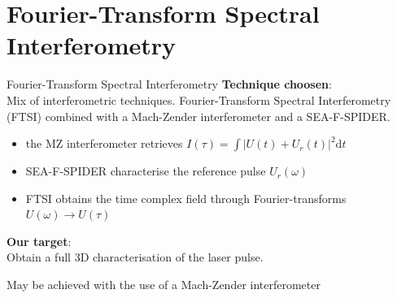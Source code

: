 \documentclass[11pt]{beamer}
\begin{document}
\section{Fourier-Transform Spectral Interferometry}
\begin{frame}{Fourier-Transform Spectral Interferometry}
\textbf{Technique choosen}:\\
Mix of interferometric techniques.
Fourier-Transform Spectral Interferometry (FTSI) combined with a Mach-Zender interferometer and a SEA-F-SPIDER.\\
\begin{itemize}
	\item the MZ interferometer retrieves $I(\tau) 	= \int|U(t) + U_r(t)|^2\mathrm{d}t$
	\item SEA-F-SPIDER characterise the reference pulse $U_r(\omega)$
	\item FTSI obtains the time complex field through Fourier-transforms $U(\omega) \rightarrow U(\tau)$
\end{itemize}

\vspace{15pt}
\textbf{Our target}:\\
Obtain a full 3D characterisation of the laser pulse.

\vspace{10pt}
May be achieved with the use of a Mach-Zender interferometer
\end{frame}

%
%
\end{document}
